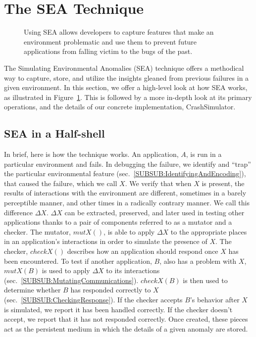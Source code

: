 \section{The SEA Technique}
\label{SEC:approach}

\begin{figure}[t]
  \center{}
  \caption{Using SEA allows developers to capture features that make an
    environment problematic and use them to prevent future applications
    from falling victim to the bugs of the past.}
  \label{figure:approach}
\end{figure}

The Simulating Environmental Anomalies (SEA) technique
offers a methodical way to
capture, store, and utilize the insights gleaned from
previous failures in a given environment.
In this section, we offer a high-level look at how
SEA works, as illustrated in Figure~\ref{figure:approach}.
This is followed by a more in-depth look at its primary operations,
and the details of our concrete implementation, CrashSimulator.

\subsection{SEA in a Half-shell}
\label{SEC:SEAHalfshell}
In brief,
here is how the technique works.
An application, $A$, is run
in a particular environment and fails.
In debugging the failure,
we identify and ``trap'' the particular environmental feature
(sec.~\ref{SUBSUB:IdentifyingAndEncoding}),
that caused the failure,  which we call $X$.
We verify that when $X$ is present,
the results of interactions with the
environment are different,
sometimes in a barely perceptible manner,
and other times in a radically contrary manner.
We call this difference $\Delta X$.
$\Delta X$ can be extracted, preserved,
and later used in testing other applications
thanks to a pair of components referred to as a mutator and a checker.
The mutator, $mutX()$,
is able to apply $\Delta X$
to the appropriate places in an application's interactions
in order to simulate the presence of $X$.
The checker, $checkX()$ describes how an
application should respond once $X$ has been encountered.
To test if another application, $B$, also has a problem with $X$,
$mutX(B)$ is used to apply $\Delta X$ to its interactions
(sec.~\ref{SUBSUB:MutatingCommunications}).
$checkX(B)$ is then used to determine whether
$B$ has responded correctly to $X$(sec.~\ref{SUBSUB:CheckingResponse}).
If the checker accepts $B$'s behavior
after $X$ is simulated,
we report it has been handled correctly.
If the checker doesn't accept, we report that it has not responded correctly.
Once created,
these pieces act as the persistent medium in which the details of
a given anomaly are stored.

